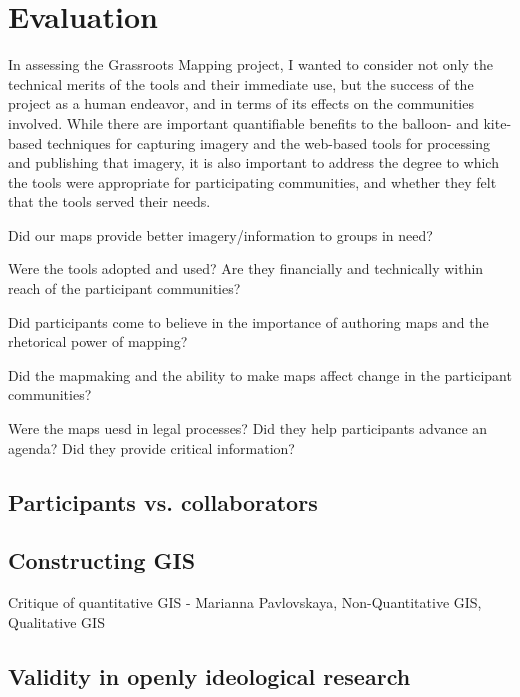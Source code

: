 \documentclass[11pt]{report}
\begin{document}
\chapter{Evaluation}

In assessing the Grassroots Mapping project, I wanted to consider not only the technical merits of the tools and their immediate use, but the success of the project as a human endeavor, and in terms of its effects on the communities involved. While there are important quantifiable benefits to the balloon- and kite-based techniques for capturing imagery and the web-based tools for processing and publishing that imagery, it is also important to address the degree to which the tools were appropriate for participating communities, and whether they felt that the tools served their needs. 

Did our maps provide better imagery/information to groups in need?

Were the tools adopted and used? Are they financially and technically within reach of the participant communities? 

Did participants come to believe in the importance of authoring maps and the rhetorical power of mapping?

Did the mapmaking and the ability to make maps affect change in the participant communities?

Were the maps uesd in legal processes? Did they help participants advance an agenda? Did they provide critical information?

\section{Participants vs. collaborators}


\section{Constructing GIS}

Critique of quantitative GIS - Marianna Pavlovskaya, Non-Quantitative GIS, Qualitative GIS

\section{Validity in openly ideological research}
\label{sec:lather}
\end{document}
